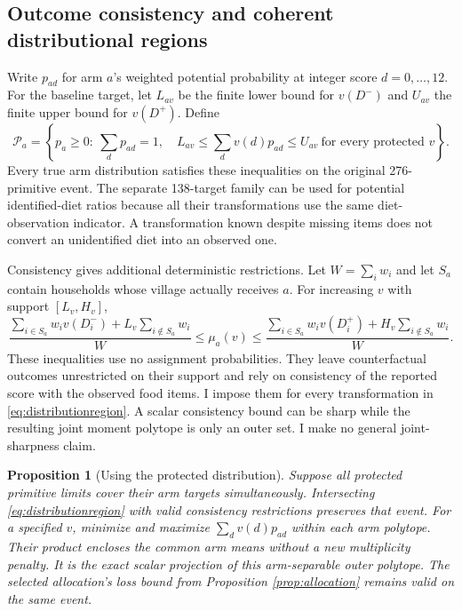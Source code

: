 \documentclass[11pt]{article}
\newtheorem{proposition}{Proposition}
\begin{document}
\subsection{Outcome consistency and coherent distributional regions}

Write $p_{ad}$ for arm $a$'s weighted potential probability at integer score $d=0,\ldots,12$. For the baseline target, let $L_{av}$ be the finite lower bound for $v(D^-)$ and $U_{av}$ the finite upper bound for $v(D^+)$. Define
\begin{equation}
 \mathcal P_a=\left\{p_a\geq0:\ \sum_dp_{ad}=1,\quad
 L_{av}\leq\sum_dv(d)p_{ad}\leq U_{av}\ \text{for every protected }v\right\}.\label{eq:distributionregion}
\end{equation}
Every true arm distribution satisfies these inequalities on the original 276-primitive event. The separate 138-target family can be used for potential identified-diet ratios because all their transformations use the same diet-observation indicator. A transformation known despite missing items does not convert an unidentified diet into an observed one.

Consistency gives additional deterministic restrictions. Let $W=\sum_iw_i$ and let $S_a$ contain households whose village actually receives $a$. For increasing $v$ with support $[L_v,H_v]$,
\begin{equation}
 \frac{\sum_{i\in S_a}w_iv(D_i^-)+L_v\sum_{i\notin S_a}w_i}{W}
 \leq\mu_a(v)\leq
 \frac{\sum_{i\in S_a}w_iv(D_i^+)+H_v\sum_{i\notin S_a}w_i}{W}.\label{eq:consistency}
\end{equation}
These inequalities use no assignment probabilities. They leave counterfactual outcomes unrestricted on their support and rely on consistency of the reported score with the observed food items. I impose them for every transformation in \eqref{eq:distributionregion}. A scalar consistency bound can be sharp while the resulting joint moment polytope is only an outer set. I make no general joint-sharpness claim.

\begin{proposition}[Using the protected distribution]\label{prop:projection}
Suppose all protected primitive limits cover their arm targets simultaneously. Intersecting \eqref{eq:distributionregion} with valid consistency restrictions preserves that event. For a specified $v$, minimize and maximize $\sum_dv(d)p_{ad}$ within each arm polytope. Their product encloses the common arm means without a new multiplicity penalty. It is the exact scalar projection of this arm-separable outer polytope. The selected allocation's loss bound from Proposition \ref{prop:allocation} remains valid on the same event.
\end{proposition}
\end{document}
